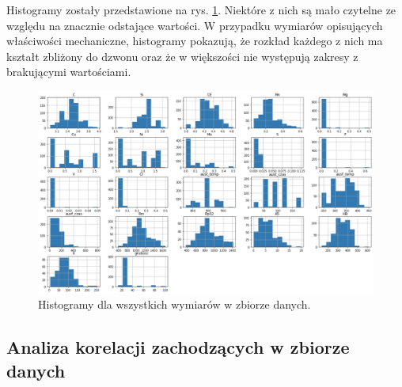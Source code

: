 Histogramy zostały przedstawione na rys. \ref{fig:histogram}. Niektóre z nich są mało czytelne ze względu na znacznie odstające wartości. W przypadku wymiarów opisujących właściwości mechaniczne, histogramy pokazują, że rozkład każdego z nich ma kształt zbliżony do dzwonu oraz że w większości nie występują zakresy z brakującymi wartościami.
\begin{figure}[ht]{}
	\centering
	\includegraphics[scale=0.43]{images/histogram.png}
	\caption {
		 Histogramy dla wszystkich wymiarów w zbiorze danych.
	}
	\label{fig:histogram}
\end{figure}
\FloatBarrier
\subsection{Analiza korelacji zachodzących w zbiorze danych}\label{correlation-analysis}
